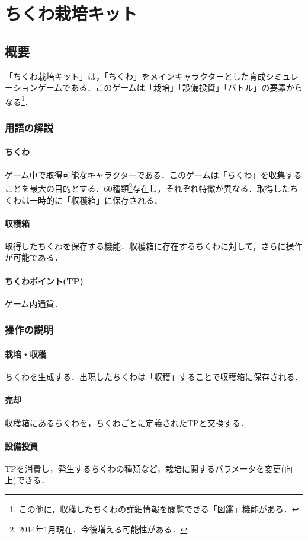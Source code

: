 \section{ちくわ栽培キット}
\subsection{概要}
「ちくわ栽培キット」は，「ちくわ」をメインキャラクターとした育成シミュレーションゲームである．このゲームは「栽培」「設備投資」「バトル」の要素からなる\footnote{この他に，収穫したちくわの詳細情報を閲覧できる「図鑑」機能がある．}．

\subsubsection{用語の解説}
\paragraph{ちくわ}
ゲーム中で取得可能なキャラクターである．このゲームは「ちくわ」を収集することを最大の目的とする．60種類\footnote{2014年1月現在．今後増える可能性がある．}存在し，それぞれ特徴が異なる．取得したちくわは一時的に「収穫箱」に保存される．

\paragraph{収穫箱}
取得したちくわを保存する機能．収穫箱に存在するちくわに対して，さらに操作が可能である．

\paragraph{ちくわポイント(TP)}
ゲーム内通貨．

\subsubsection{操作の説明}
\paragraph{栽培・収穫}
ちくわを生成する．出現したちくわは「収穫」することで収穫箱に保存される．

\paragraph{売却}
収穫箱にあるちくわを，ちくわごとに定義されたTPと交換する．

\paragraph{設備投資}
TPを消費し，発生するちくわの種類など，栽培に関するパラメータを変更(向上)できる．

